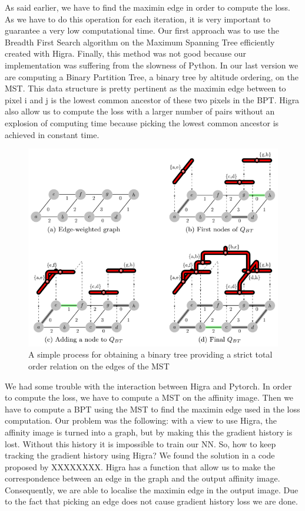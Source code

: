 As said earlier, we have to find the maximin edge in order to compute the loss. As we have to do this operation for each iteration, it is very important to guarantee a very low computational time. Our first approach was to use the Breadth First Search algorithm on the Maximum Spanning Tree efficiently created with Higra. Finally, this method was not good because our implementation was suffering from the slowness of Python. 
In our last version we are computing a Binary Partition Tree, a binary tree by altitude ordering, on the MST. This data structure is pretty pertinent as the maximin edge between to pixel i and j is the lowest common ancestor of these two pixels in the BPT. Higra also allow us to compute the loss with a larger number of pairs without an explosion of computing time because picking the lowest common ancestor is achieved in constant time.

\begin{figure}[!htbp]
	\centering
	\includegraphics[width=0.7\linewidth]{./images/bpt.png}
	\caption{A simple process for obtaining a binary tree providing a strict total order relation on the edges of the MST~\cite{najman_playing_2013}}%
	\label{fig:bpt_method}
\end{figure}

We had some trouble with the interaction between Higra and Pytorch. In order to compute the loss, we have to compute a MST on the affinity image. Then we have to compute a BPT using the MST to find the maximin edge used in the loss computation. Our problem was the following: with a view to use Higra, the affinity image is turned into a graph, but by making this the gradient history is lost. Without this history it is impossible to train our NN. So, how to keep tracking the gradient history using Higra?
We found the solution in a code proposed by XXXXXXXX. Higra has a function that allow us to make the correspondence between an edge in the graph and the output affinity image. Consequently, we are able to localise the maximin edge in the output image. Due to the fact that picking an edge does not cause gradient history loss we are done.

